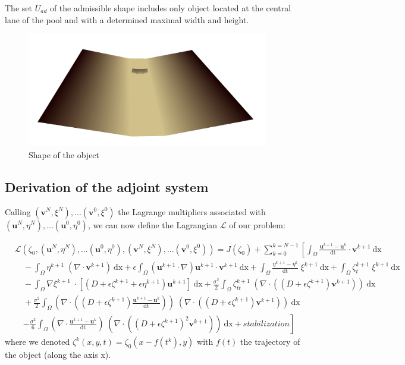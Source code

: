 \documentclass[11pt,a4paper]{article}
\begin{document}
		The set $U_{ad}$ of the admissible shape includes only object located at the central lane of the pool and with a determined maximal width and height.
		
		\begin{figure}[!h]
			\centering
			\includegraphics[height=5cm]{Object}
			\caption{Shape of the object}
		\end{figure}
				
		\subsection{Derivation of the adjoint system}
		Calling $(\mathbf{v}^N, \xi^N), ... (\mathbf{v}^0, \xi^0)$ the Lagrange multipliers associated with $(\mathbf{u}^N, \eta^N), ... (\mathbf{u}^0, \eta^0)$, we can now define the Lagrangian $\mathcal{L} $ of our problem: 
		
		\begin{equation}
			\begin{split}
				&\mathcal{L}(\zeta_0, (\mathbf{u}^N, \eta^N), ... (\mathbf{u}^0, \eta^0), 	(\mathbf{v}^N, \xi^N), ... (\mathbf{v}^0, \xi^0))	= J(\zeta_0) + \sum_{k=0}^{k=N-1} \left[ \int_{\Omega} \! \frac{\mathbf{u}^{k+1} - \mathbf{u}^k}{\mathrm{dt}} \cdot	\mathbf{v}^{k+1} \: \mathrm{dx} \right. \\
				 &\quad - \int_{\Omega} \! \eta^{k+1} \; (\nabla \cdot \mathbf{v}^{k+1}) \: \mathrm{dx} + \epsilon \! \int_{\Omega} \! (\mathbf{u}^{k+1} \cdot \nabla ) \mathbf{u}^{k+1} \cdot	\mathbf{v}^{k+1} \: \mathrm{dx} + \displaystyle\int_{\Omega}\! \frac{\eta^{k+1} - \eta^{k}}{\mathrm{dt}} \; \xi^{k+1} \: \mathrm{dx} + \int_{\Omega}\! \zeta^{k+1}_t \; \xi^{k+1} \: \mathrm{dx} \\
				 &\quad-\int_{\Omega}\! \nabla \xi^{k+1} \; \cdot [(D + \epsilon \zeta^{k+1} + \epsilon \eta^{k+1}) \mathbf{u}^{k+1}] \:	\mathrm{dx} + \frac{\sigma^2}{2} \! \int_{\Omega} \! \zeta^{k+1}_{tt}  \; (\nabla \cdot( (D+\epsilon \zeta^{k+1}) \mathbf{v}^{k+1})) \: \mathrm{dx} \\ 
					&\quad+ \frac{\sigma^2}{2} \! \int_{\Omega} \!  (\nabla \cdot ((D + \epsilon \zeta^{k+1})	\frac{\mathbf{u}^{k+1} - \mathbf{u}^{k}}{\mathrm{dt}})) \; (\nabla \cdot ((D + \epsilon \zeta^{k+1}) \mathbf{v}^{k+1})) \: \mathrm{dx} \\
					&\quad\left. - \frac{\sigma^2}{6} \! \int_{\Omega} \! (\nabla 
					\cdot \frac{\mathbf{u}^{k+1} - \mathbf{u}^{k}}{\mathrm{dt}}) \; (\nabla  \cdot	((D + \epsilon \zeta^{k+1})^2  \mathbf{v}^{k+1})) \: \mathrm{dx} + stabilization\right]	
			\end{split}
		\end{equation}
		where we denoted $\zeta^k(x,y,t) = \zeta_0(x-f(t^k),y)$ with $f(t)$ the trajectory of the object (along the axis x).
		
\end{document}
